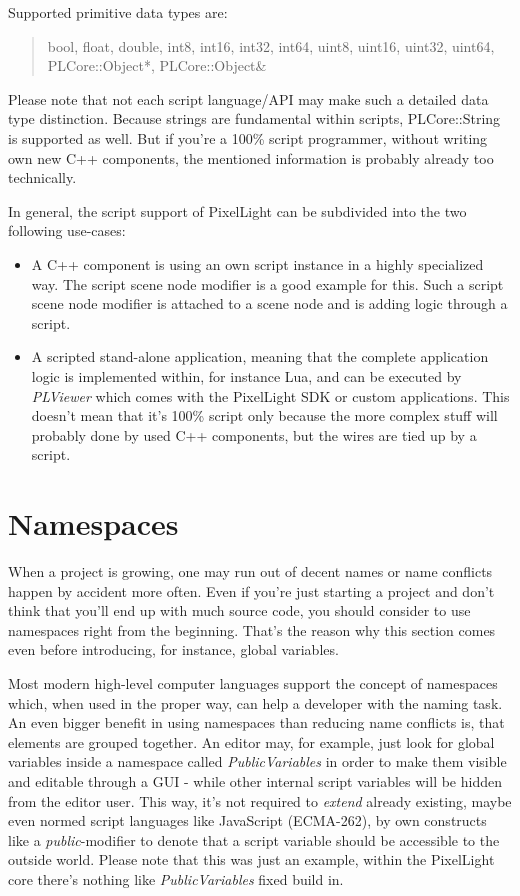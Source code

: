 Supported primitive data types are: \begin{quote}bool, float, double, int8, int16, int32, int64, uint8, uint16, uint32, uint64, PLCore::Object*, PLCore::Object\&\end{quote}

Please note that not each script language/API may make such a detailed data type distinction. Because strings are fundamental within scripts, PLCore::String is supported as well. But if you're a 100\% script programmer, without writing own new C++ components, the mentioned information is probably already too technically.

In general, the script support of PixelLight can be subdivided into the two following use-cases:
\begin{itemize}
\item{A C++ component is using an own script instance in a highly specialized way. The script scene node modifier is a good example for this. Such a script scene node modifier is attached to a scene node and is adding logic through a script.}
\item{A scripted stand-alone application, meaning that the complete application logic is implemented within, for instance Lua, and can be executed by \emph{PLViewer} which comes with the PixelLight SDK or custom applications. This doesn't mean that it's 100\% script only because the more complex stuff will probably done by used C++ components, but the wires are tied up by a script.}
\end{itemize}




\section{Namespaces}
\label{Script_Namespaces}
When a project is growing, one may run out of decent names or name conflicts happen by accident more often. Even if you're just starting a project and don't think that you'll end up with much source code, you should consider to use namespaces right from the beginning. That's the reason why this section comes even before introducing, for instance, global variables.

Most modern high-level computer languages support the concept of namespaces which, when used in the proper way, can help a developer with the naming task. An even bigger benefit in using namespaces than reducing name conflicts is, that elements are grouped together. An editor may, for example, just look for global variables inside a namespace called \emph{PublicVariables} in order to make them visible and editable through a GUI - while other internal script variables will be hidden from the editor user. This way, it's not required to \emph{extend} already existing, maybe even normed script languages like JavaScript (ECMA-262), by own constructs like a \emph{public}-modifier to denote that a script variable should be accessible to the outside world. Please note that this was just an example, within the PixelLight core there's nothing like \emph{PublicVariables} fixed build in.


